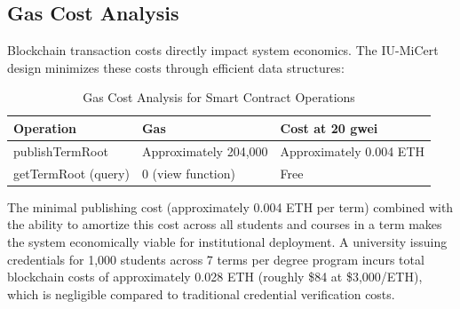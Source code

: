 \subsection{Gas Cost Analysis}
\label{subsec:gas-analysis}

Blockchain transaction costs directly impact system economics. The IU-MiCert design minimizes these costs through efficient data structures:

\begin{table}[H]
\centering
\caption{Gas Cost Analysis for Smart Contract Operations}
\label{tab:gas-costs}
\begin{tabular}{|p{4.5cm}|p{3cm}|p{5.5cm}|}
\hline
\textbf{Operation} & \textbf{Gas} & \textbf{Cost at 20 gwei} \\
\hline
publishTermRoot & Approximately 204,000 & Approximately 0.004 ETH \\
\hline
getTermRoot (query) & 0 (view function) & Free \\
\hline
\end{tabular}
\end{table}

The minimal publishing cost (approximately 0.004 ETH per term) combined with the ability to amortize this cost across all students and courses in a term makes the system economically viable for institutional deployment. A university issuing credentials for 1,000 students across 7 terms per degree program incurs total blockchain costs of approximately 0.028 ETH (roughly \$84 at \$3,000/ETH), which is negligible compared to traditional credential verification costs.
